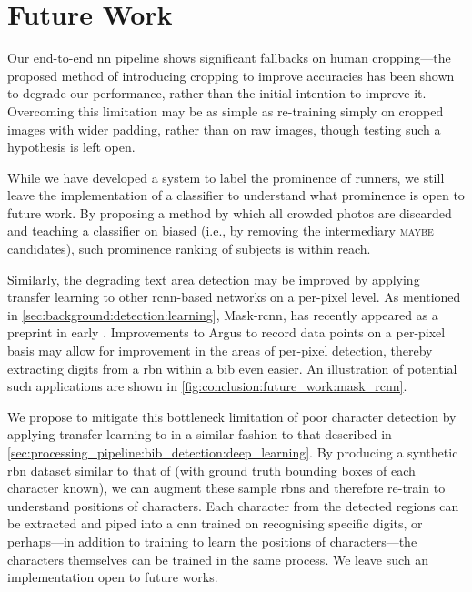 

\section{Future Work}

Our end-to-end \gls{nn} pipeline shows significant fallbacks on human cropping---the proposed method of introducing cropping to improve accuracies has been shown to degrade our performance, rather than the initial intention to improve it. Overcoming this limitation may be as simple as re-training \frcnn{} simply on cropped images with wider padding, rather than on raw images, though testing such a hypothesis is left open.

While we have developed a system to label the prominence of runners, we still leave the implementation of a classifier to understand what prominence is open to future work. By proposing a method by which all crowded photos are discarded and teaching a classifier on biased  (i.e., by removing the intermediary \textsc{maybe} candidates), such prominence ranking of subjects is within reach.

Similarly, the degrading text area detection may be improved by applying transfer learning to other \gls{rcnn}-based networks on a per-pixel level. As mentioned in \cref{sec:background:detection:learning}, Mask-\gls{rcnn}, has recently appeared as a preprint in early \citeyear{He:2017ud}. Improvements to Argus to record data points on a per-pixel basis may allow for improvement in the areas of per-pixel detection, thereby extracting digits from a \gls{rbn} within a bib even easier. An illustration of potential such applications are shown in \cref{fig:conclusion:future_work:mask_rcnn}.

We propose to mitigate this bottleneck limitation of poor character detection by applying transfer learning to \frcnn{} in a similar fashion to that described in \cref{sec:processing_pipeline:bib_detection:deep_learning}. By producing a synthetic \gls{rbn} dataset similar to that of \citet{Jaderberg:2014uy,Jaderberg:2016wj} (with ground truth bounding boxes of each character known), we can augment these sample \glspl{rbn} and therefore re-train \frcnn{} to understand positions of characters. Each character from the detected regions can be extracted and piped into a \gls{cnn} trained on recognising specific digits, or perhaps---in addition to training \frcnn{} to learn the positions of characters---the characters themselves can be trained in the same process. We leave such an implementation open to future works.

